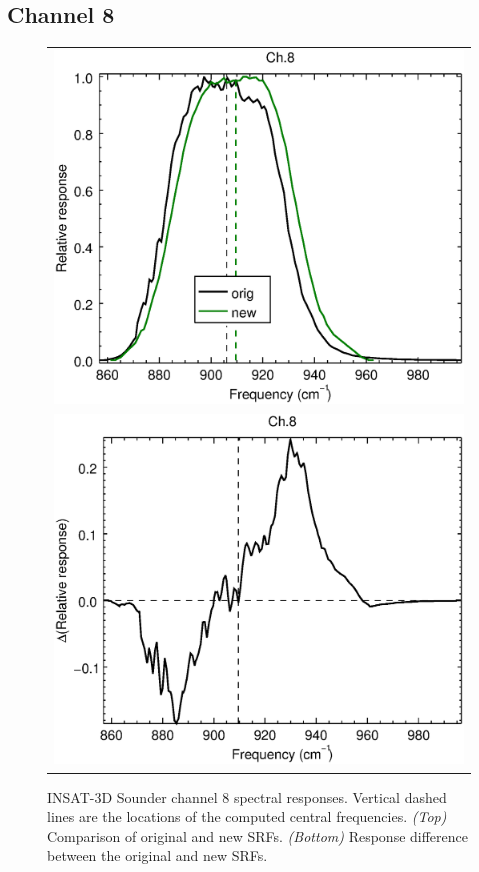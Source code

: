 \subsection{Channel 8}
\begin{figure}[H]
  \centering
  \begin{tabular}{c}
    \includegraphics[scale=0.55]{graphics/sndr/srf/sndr_insat3d-8.eps} \\
    \includegraphics[scale=0.55]{graphics/sndr/srf/sndr_insat3d-8.difference.eps}
  \end{tabular}
  \caption{INSAT-3D Sounder channel 8 spectral responses. Vertical dashed lines are the locations of the computed central frequencies. \emph{(Top)} Comparison of original and new SRFs. \emph{(Bottom)} Response difference between the original and new SRFs.}
  \label{fig:sndr_ch8}
\end{figure}

